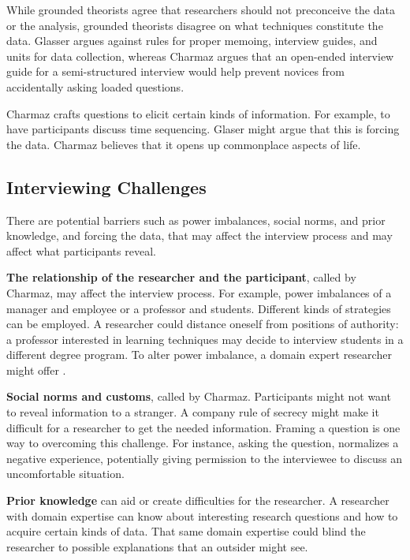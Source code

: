 While grounded theorists agree that researchers should not preconceive the data or the analysis, grounded theorists disagree on what techniques constitute  the data. Glasser \cite{GlaserIssues} argues against rules for proper memoing, interview guides, and units for data collection, whereas Charmaz argues that an open-ended interview guide for a semi-structured interview would help prevent novices from accidentally asking loaded questions. 

Charmaz crafts questions to elicit certain kinds of information. For example,  to have participants discuss time sequencing. Glaser might argue that this is forcing the data.  Charmaz believes that it opens up commonplace aspects of life.
\subsection{Interviewing Challenges}
There are potential barriers such as power imbalances, social norms, and prior knowledge, and forcing the data, that may affect the interview process and may affect what participants reveal. 

\textbf{The relationship of the researcher and the participant}, called  by Charmaz, may affect the interview process. For example, power imbalances of a manager and employee or a professor and students.  Different kinds of strategies can be employed. A researcher could distance oneself from positions of authority: a professor interested in learning techniques may decide to interview students in a different degree program. To alter power imbalance, a domain expert researcher might offer  \cite{Charmaz}.

\textbf{Social norms and customs}, called  by Charmaz. Participants might not want to reveal information to a stranger. A company rule of secrecy might make it difficult for a researcher to get the needed information. Framing a question is one way to overcoming this challenge. For instance, asking the question,   normalizes a negative experience, potentially giving permission to the interviewee to discuss an uncomfortable situation.

\textbf{Prior knowledge} can aid or create difficulties for the researcher. A researcher with domain expertise can know about interesting research questions and how to acquire certain kinds of data. That same domain expertise could blind the researcher to possible explanations that an outsider might see.

